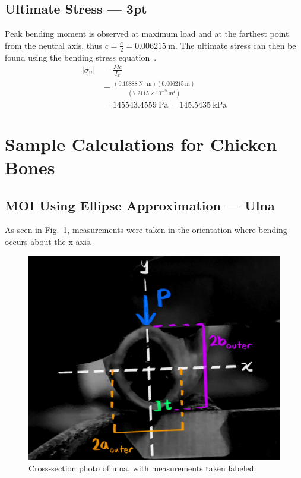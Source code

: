 \documentclass[conference, letterpaper]{IEEEtran}
\begin{document}
        \subsection{Ultimate Stress --- 3pt}\label{apdx_ad}
            Peak bending moment is observed at maximum load and at the farthest point from the neutral axis, thus \(c = \frac{a}{2} = 0.006215\ \text{m}\). The ultimate stress can then be found using the bending stress equation~\cite{Hibbeler2022}.
            \begin{align*}
                \vert \sigma _u \vert 
                &= \frac{Mc}{I_x} \\
                &= \frac{(0.16888\ \text{N}\cdot\text{m})(0.006215\ \text{m})}{(7.2115\times10^{-9}\ \text{m}^4)} \\
                &= 145543.4559\ \text{Pa}
                = 145.5435\ \text{kPa}
            \end{align*}

    \section{Sample Calculations for Chicken Bones}\label{apdx_b}
        \subsection{MOI Using Ellipse Approximation --- Ulna}\label{apdx_ba}
            As seen in Fig.~\ref{ulna_measurements}, measurements were taken in the orientation where bending occurs about the x-axis.
            \begin{figure}[htbp]
                \centerline{\includegraphics[width = 0.75\linewidth]{ulna_measurements.png}}
                \caption{Cross-section photo of ulna, with measurements taken labeled.}\label{ulna_measurements}
            \end{figure}
            
\end{document}
